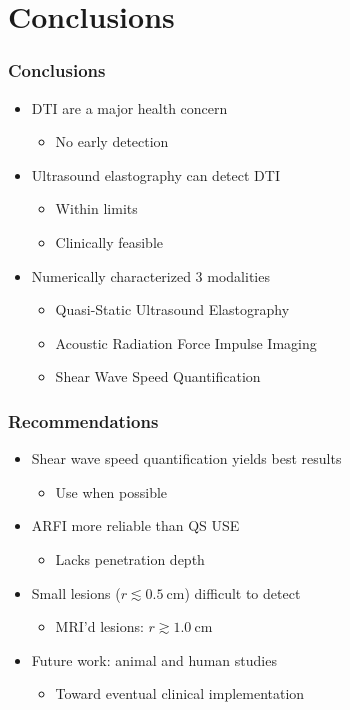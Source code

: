 \documentclass{beamer}
\begin{document}
	\section{Conclusions}
		\begin{frame}
			\frametitle{Conclusions}
			\begin{itemize}
				\item DTI are a major health concern
				\begin{itemize}
					\item No early detection
				\end{itemize}
				\item Ultrasound elastography \alert{can} detect DTI
				\begin{itemize}
					\item Within limits
					\item Clinically feasible
				\end{itemize}
				\item Numerically characterized 3 modalities
				\begin{itemize}
					\item Quasi-Static Ultrasound Elastography
					\item Acoustic Radiation Force Impulse Imaging
					\item Shear Wave Speed Quantification%
				\end{itemize}
			\end{itemize}
		\end{frame}

		\begin{frame}
			\frametitle{Recommendations}
			\begin{itemize}
				\item \alert{Shear wave speed quantification} yields best results
				\begin{itemize}
					\item Use when possible
				\end{itemize}
				\item ARFI more reliable than QS USE
				\begin{itemize}
					\item Lacks penetration depth
				\end{itemize}
				\item Small lesions ($r \lesssim \SI{0.5}{\cm}$) difficult to detect
				\begin{itemize}
					\item MRI'd lesions: $r \gtrsim \SI{1.0}{\cm}$
				\end{itemize}
				\item Future work: \alert{animal} and \alert{human} studies
				\begin{itemize}
					\item Toward eventual clinical implementation
				\end{itemize}
			\end{itemize}
		\end{frame}
		
\end{document}
